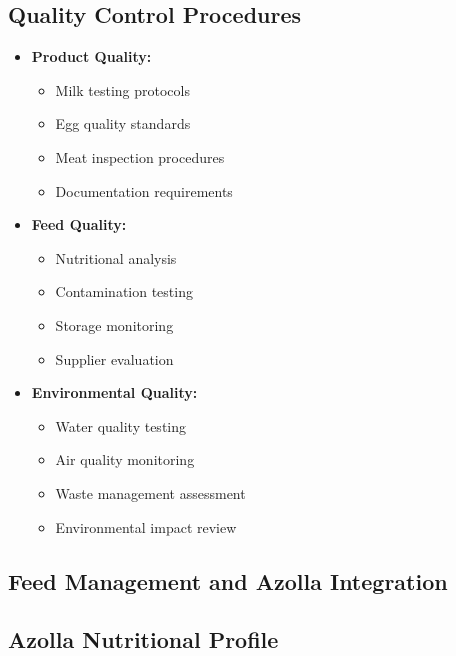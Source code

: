 \subsection{Quality Control Procedures}
\begin{itemize}
    \item \textbf{Product Quality:}
    \begin{itemize}
        \item Milk testing protocols
        \item Egg quality standards
        \item Meat inspection procedures
        \item Documentation requirements
    \end{itemize}
    
    \item \textbf{Feed Quality:}
    \begin{itemize}
        \item Nutritional analysis
        \item Contamination testing
        \item Storage monitoring
        \item Supplier evaluation
    \end{itemize}
    
    \item \textbf{Environmental Quality:}
    \begin{itemize}
        \item Water quality testing
        \item Air quality monitoring
        \item Waste management assessment
        \item Environmental impact review
    \end{itemize}
\end{itemize}

\subsection{Feed Management and Azolla Integration} \label{sec:azolla_production_team} \label{sec:azolla_farming_unit}
\label{sec:feed_management}

\subsection{Azolla Nutritional Profile} \label{sec:azolla_production_records}
\label{sec:azolla_nutrition}

